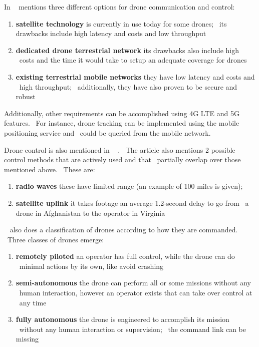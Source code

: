 In ~\cite{ericsson1} mentions three different options for drone communication and control:
\begin{enumerate}
    \item \textbf{satellite technology} is currently in use today for some drones; \
            its drawbacks include high latency and costs and low throughput
    \item \textbf{dedicated drone terrestrial network} its drawbacks also include high \
            costs and the time it would take to setup an adequate coverage for drones
    \item \textbf{existing terrestrial mobile networks} they have low latency and costs and \
            high throughput; \
            additionally, they have also proven to be secure and robust
\end{enumerate}

Additionally, other requirements can be accomplished using 4G LTE and 5G features. \
For instance, drone tracking can be implemented using the mobile positioning service and \
could be queried from the mobile network.

Drone control is also mentioned in ~\cite{forbes1} . \
The article also mentions 2 possible control methods that are actively used and that \
partially overlap over those mentioned above. \
These are:
\begin{enumerate}
    \item \textbf{radio waves} these have limited range (an example of 100 miles is given);
    \item \textbf{satellite uplink} it takes footage an average 1.2-second delay to go from \
            a drone in Afghanistan to the operator in Virginia
\end{enumerate}

~\cite{forbes1} also does a classification of drones according to how they are commanded. \
Three classes of drones emerge:
\begin{enumerate}
    \item \textbf{remotely piloted} an operator has full control, while the drone can do \
            minimal actions by its own, like avoid crashing
    \item \textbf{semi-autonomous} the drone can perform all or some missions without any \
            human interaction, however an operator exists that can take over control at \
            any time
    \item \textbf{fully autonomous} the drone is engineered to accomplish its mission \
            without any human interaction or supervision; \
            the command link can be missing
\end{enumerate}

